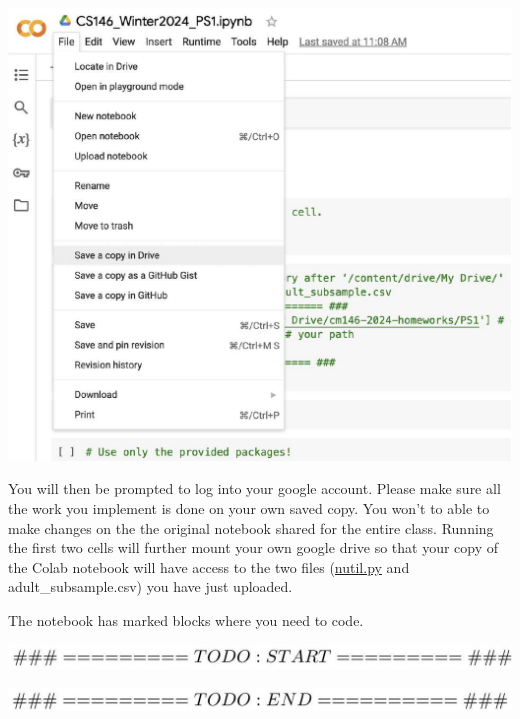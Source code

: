 \documentclass[10pt]{article}
\begin{document}
\begin{center}
\includegraphics[max width=\textwidth]{2024_01_30_d638f3fd533378d9b317g-4(2)}
\end{center}

You will then be prompted to log into your google account. Please make sure all the work you implement is done on your own saved copy. You won't to able to make changes on the the original notebook shared for the entire class. Running the first two cells will further mount your own google drive so that your copy of the Colab notebook will have access to the two files (\href{http://nutil.py}{nutil.py} and adult\_subsample.csv) you have just uploaded.

The notebook has marked blocks where you need to code.

\begin{center}
\includegraphics[max width=\textwidth]{2024_01_30_d638f3fd533378d9b317g-4(1)}
\end{center}

\begin{center}
\includegraphics[max width=\textwidth]{2024_01_30_d638f3fd533378d9b317g-4}
\end{center}
\end{document}
